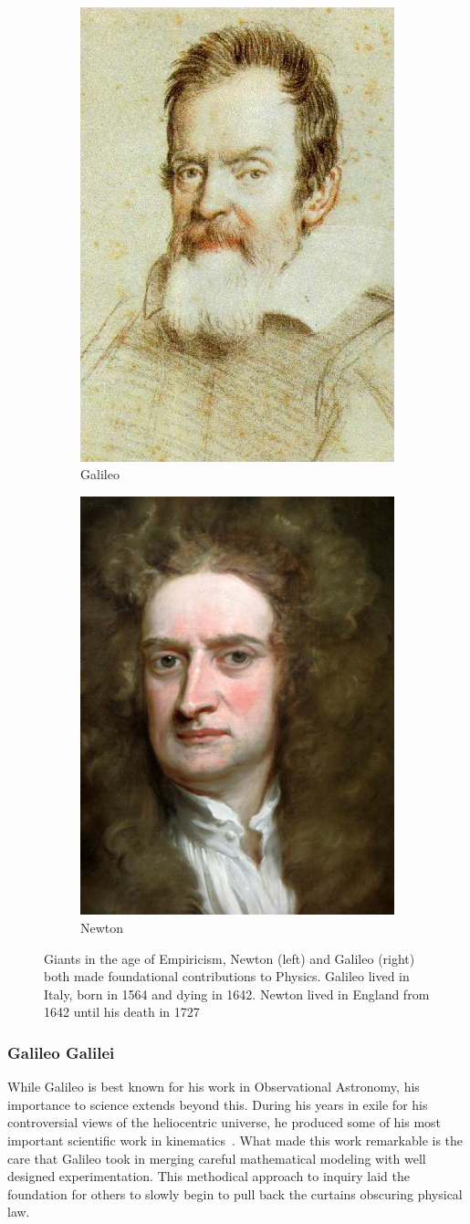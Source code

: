 \begin{figure}[ht]
	\centering
	\begin{subfigure}{.5\textwidth}
		\centering
		\includegraphics[width=0.4\linewidth]{./figures/galileo.jpg}
		\caption{Galileo \cite{Leoni1624}}
		\label{fig:galileo}
	\end{subfigure}%
	\begin{subfigure}{0.5\textwidth}
		\centering
		\includegraphics[width=0.4\linewidth]{./figures/newton.jpg}
		\caption{Newton}
		\label{fig:newton}
	\end{subfigure}
	\caption{ 
		Giants in the age of Empiricism, Newton (left) and
		Galileo (right) both made foundational contributions to Physics.
		Galileo lived in Italy, born in 1564 and dying in 1642. Newton lived in
		England from 1642 until his death in 1727
	}
	\label{fig:newtongalileo}
\end{figure}

\subsubsection{Galileo Galilei}
While Galileo is best known for his work in Observational Astronomy, his
importance to science extends beyond this. During his years in exile for his
controversial views of the heliocentric universe, he produced some of his most
important scientific work in kinematics~\cite{Hall1965}. What made this work
remarkable is the care that Galileo took in merging careful mathematical
modeling with well designed experimentation. This methodical approach to inquiry
laid the foundation for others to slowly begin to pull back the curtains
obscuring physical law.

